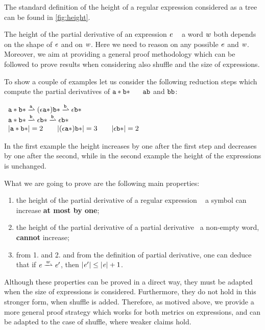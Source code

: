 The standard definition of the height of a regular expression considered as a tree can be found in \cref{fig:height}.

The height of the partial derivative of an expression $\mathit {e}$  \wrt~ a word $\mathit {w}$ both depends on the shape of $\mathit {e}$ and on $\mathit {w}$.
Here we need to reason on any possible $\mathit {e}$ and $\mathit {w}$. Moreover, we aim at providing a general proof methodology which can be followed to prove results when considering also shuffle and the size of expressions.

To show a couple of examples let us consider the following reduction steps which compute the partial derivatives of ${\mathtt {a}}*{\mathtt {b}}*$~
\wrt~ $\mathtt {a}\mathtt {b}$ and $\mathtt {b}\mathtt {b}$:
\begin{flushleft}
 $
  \begin{array}{l}
   \starop{\sym}\catop\starop{\asym}\parDer{\sym}(\eps\catop\starop{\sym})\catop\starop{\asym}\parDer{\asym}\eps\catop\starop{\asym} \\
   \starop{\sym}\catop\starop{\asym}\parDer{\asym}\eps\catop\starop{\asym}\parDer{\asym}\eps\catop\starop{\asym}                     \\
   \theight{\starop{\sym}\catop\starop{\asym}}=2\qquad \theight{(\eps\catop\starop{\sym})\catop\starop{\asym}}=3 \qquad \theight{\eps\catop\starop{\asym}}=2
  \end{array}
 $
\end{flushleft}
In the first example the height increases by one after the first step and decreases by one after the second, while in the second example the height of the expressions is unchanged.

What we are going to prove are the following main properties:
\begin{enumerate}
 \item the height of the partial derivative of a regular expression \wrt~ a symbol can increase \textbf{at most by one};
 \item the height of the partial derivative of a partial derivative \wrt~a non-empty word, \textbf{cannot} increase;
 \item from 1. and 2. and from the definition of partial derivative, one can deduce that if $\re\parDer{\word}\re'$, then ${\mid}{\mathit {e}'}{\mid}\leq{\mid}{\ensuremath{\mathit {e}}}{\mid}+1$.
\end{enumerate}
Although these properties can be proved in a direct way, they must be adapted when the size of expressions is considered.
Furthermore, they do not hold in this stronger form, when shuffle is added. Therefore, as motived above, we provide a more general proof strategy which works for both metrics on expressions, and can be adapted to the case of shuffle, where weaker claims hold.

